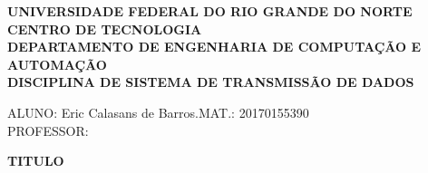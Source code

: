 \documentclass[a4paper, 12pt, fleqn]{article}
\begin{document}
	\begin{center}
		\textbf{UNIVERSIDADE FEDERAL DO RIO GRANDE DO NORTE\\		
		CENTRO DE TECNOLOGIA\\		
		DEPARTAMENTO DE ENGENHARIA DE COMPUTAÇÃO E AUTOMAÇÃO\\		
		DISCIPLINA DE SISTEMA DE TRANSMISSÃO DE DADOS}
	\end{center}

ALUNO:  Eric Calasans de Barros.\hspace{2cm}MAT.:  20170155390\\
PROFESSOR:  

	\begin{center}
		\large{\textbf{TITULO}}
	\end{center}
	
\end{document}
